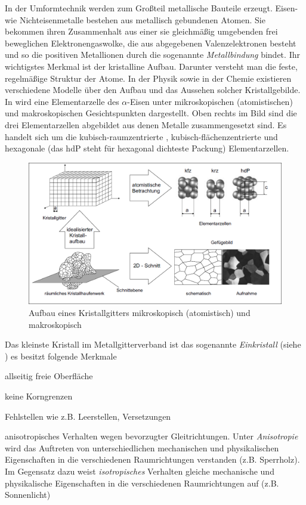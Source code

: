 \documentclass[12pt,a4paper,parskip,twoside,BCOR5mm,headsepline]{scrartcl}
\begin{document}
\begin{description*}
{In der Umformtechnik werden zum Großteil metallische Bauteile erzeugt. Eisen- wie Nichteisenmetalle bestehen aus metallisch gebundenen Atomen. Sie bekommen ihren Zusammenhalt aus einer sie gleichmäßig umgebenden frei beweglichen Elektronengaswolke, die aus abgegebenen Valenzelektronen besteht und so die positiven Metallionen  durch die sogenannte \emph{Metallbindung} bindet. \autocite[12]{wki} Ihr wichtigstes Merkmal ist der kristalline Aufbau. Darunter versteht man die feste, regelmäßige Struktur der Atome. In der Physik sowie in der Chemie existieren verschiedene Modelle über den Aufbau und das Aussehen solcher Kristallgebilde. In  wird eine Elementarzelle des $\alpha $-Eisen unter mikroskopischen (atomistischen) und makroskopischen Gesichtspunkten dargestellt. Oben rechts im Bild sind die drei Elementarzellen abgebildet aus denen Metalle zusammengesetzt sind. Es handelt sich um die  kubisch-raumzentrierte , kubisch-flächenzentrierte und hexagonale (das hdP steht für hexagonal dichteste Packung) Elementarzellen. \autocite[3-5]{fu}
\begin{figure}
\centering
\includegraphics[width=.8\textwidth]{makromikro}
\caption[Aufbau Kristallgitter]{Aufbau eines Kristallgitters mikroskopisch (atomistisch) und makroskopisch \autocite[4]{fu}}
\label{fig:makromikro}
\end{figure}


Das kleinste Kristall im Metallgitterverband ist das sogenannte \emph{Einkristall} (siehe ) es besitzt folgende Merkmale




\begin{itemize*}
\item allseitig freie Oberfläche
\item keine Korngrenzen
\item Fehlstellen wie z.B. Leerstellen, Versetzungen
\item anisotropisches Verhalten wegen bevorzugter Gleitrichtungen. Unter \emph{Anisotropie} wird das Auftreten von unterschiedlichen mechanischen und physikalischen Eigenschaften in die verschiedenen Raumrichtungen verstanden (z.B. Sperrholz). Im Gegensatz dazu weist \emph{isotropisches} Verhalten gleiche mechanische und physikalische Eigenschaften in die verschiedenen Raumrichtungen auf (z.B. Sonnenlicht) \autocite[37]{hu}



\end{itemize*}}
\end{description*}
\end{document}
